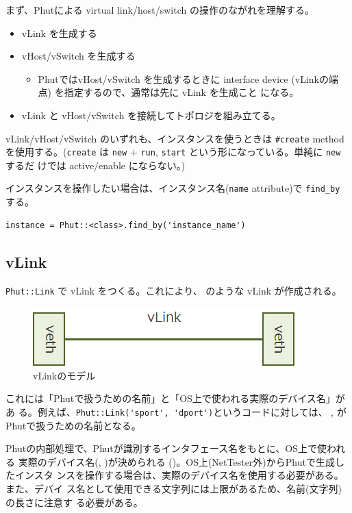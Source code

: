 まず、Phutによる virtual link/host/switch の操作のながれを理解する。
\begin{itemize}
 \item vLink を生成する
 \item vHost/vSwitch を生成する
       \begin{itemize}
        \item PhutではvHost/vSwitch を生成するときに interface device
              (vLinkの端点) を指定するので、通常は先に vLink を生成こと
              になる。
       \end{itemize}
 \item vLink と vHost/vSwitch を接続してトポロジを組み立てる。
\end{itemize}

vLink/vHost/vSwitch のいずれも、インスタンスを使うときは \verb|#create|
method を使用する。(\verb|create| は \verb|new| +
\verb|run|, \verb|start| という形になっている。単純に \verb|new| するだ
けでは active/enable にならない。)

インスタンスを操作したい場合は、インスタンス名(\verb|name| attribute)で
\verb|find_by| する。
\begin{lstlisting}
instance = Phut::<class>.find_by('instance_name')
\end{lstlisting}

\subsection{vLink}

\verb|Phut::Link| で vLink をつくる。これにより、
のような vLink が作成される。

\begin{figure}[h]
 \centering
 \includegraphics[scale=0.6]{img/phut-vlink-model.png}
 \caption{vLinkのモデル}
 \label{fig:vlink-model}
\end{figure}

これには「Phutで扱うための名前」と「OS上で使われる実際のデバイス名」があ
る。例えば、\verb|Phut::Link('sport', 'dport')|というコードに対しては、
, がPhutで扱うための名前となる。

Phutの内部処理で、Phutが識別するインタフェース名をもとに、OS上で使われる
実際のデバイス名(, )が決められる
()。OS上(NetTester外)からPhutで生成したインスタ
ンスを操作する場合は、実際のデバイス名を使用する必要がある。また、デバイ
ス名として使用できる文字列には上限があるため、名前(文字列)の長さに注意す
る必要がある。

